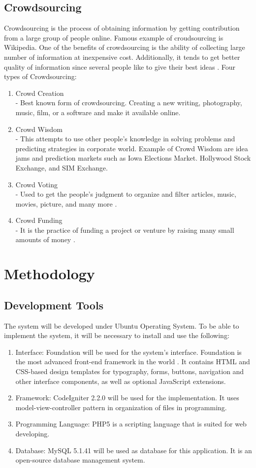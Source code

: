 \documentclass[journal]{./IEEE/IEEEtran}
\begin{document}
\subsection{Crowdsourcing}
Crowdsourcing is the process of obtaining information by getting contribution from a large group of people online. Famous example of croudsourcing is Wikipedia. One of the benefits of crowdsourcing is the ability of collecting large number of information at inexpensive cost. Additionally, it tends to get better quality of information since several people like to give their best ideas \cite{electronic_cs}. 
Four types of Crowdsourcing:
\begin{enumerate}
	\item Crowd Creation \\
		- Best known form of crowdsourcing. Creating a new writing, photography, music, film, or a software and make it available online.
	\item Crowd Wisdom \\
		- This attempts to use other people's knowledge in solving problems and predicting strategies in corporate world. Example of Crowd Wisdom are idea jams and prediction markets such as Iowa Elections Market. Hollywood Stock Exchange, and SIM Exchange. \cite{electronic_cst} 
	\item Crowd Voting \\
		- Used to get the people's judgment to organize and filter articles, music, movies, picture, and many more \cite{electronic_csw}. 
	\item Crowd Funding \\
		- It is the practice of funding a project or venture by raising many small amounts of money \cite{book_oxford}.
\end{enumerate}
\section{Methodology}
\subsection{Development Tools}
	The system will be developed under Ubuntu Operating System. To be able to implement the system, it will be necessary to install and use the following:
	 \begin{enumerate}
		\item Interface: Foundation will be used for the system's interface. Foundation is the most advanced front-end framework in the world \cite{electronic_foun} . It contains HTML and CSS-based design templates for typography, forms, buttons, navigation and other interface components, as well as optional JavaScript extensions.
		\item Framework: CodeIgniter 2.2.0 will be used for the implementation. It uses model-view-controller pattern in organization of files in programming.
		\item Programming Language: PHP5 is a scripting language that is suited for web developing. 
		\item Database: MySQL 5.1.41 will be used as database for this application. It is an open-source database management system.
	\end {enumerate} 
\end{document}
